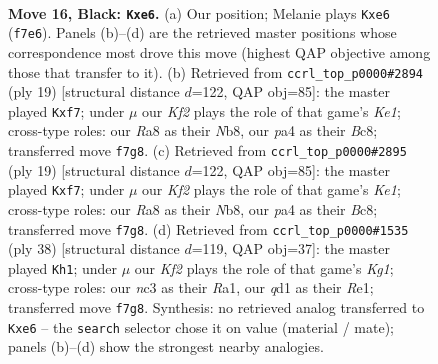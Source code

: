 \documentclass[11pt]{article}
\begin{document}
\clearpage

\begin{figure}[p]\centering
\begin{subfigure}{0.46\textwidth}\centering
\resizebox{\linewidth}{!}{%
\newchessgame
\chessboard[
  setfen={rnbq1r2/pp1n1k2/4P1p1/2b3P1/P7/2N2N2/1P3P2/R1BQKB1R b KQ - 0 16},
  showmover=false,
  pgfstyle=straightmove, color=movearrow, markmove={f7-e6}
]}
\caption{}
\end{subfigure}\hfill
\begin{subfigure}{0.46\textwidth}\centering
\resizebox{\linewidth}{!}{%
\newchessgame
\chessboard[
  setfen={rnbqk2r/pp2pPbp/6p1/4n3/3N4/2N5/PPP3PP/R1BQKB1R b KQkq - 0 10},
  showmover=false,
  pgfstyle=straightmove, color=movearrow, markmove={e8-f7}
]}
\caption{}
\end{subfigure}
\\[4pt]
\begin{subfigure}{0.46\textwidth}\centering
\resizebox{\linewidth}{!}{%
\newchessgame
\chessboard[
  setfen={rnbqk2r/pp2pPbp/6p1/4n3/3N4/2N5/PPP3PP/R1BQKB1R b KQkq - 0 10},
  showmover=false,
  pgfstyle=straightmove, color=movearrow, markmove={e8-f7}
]}
\caption{}
\end{subfigure}\hfill
\begin{subfigure}{0.46\textwidth}\centering
\resizebox{\linewidth}{!}{%
\newchessgame
\chessboard[
  setfen={r1bqr1k1/1p2bp2/p1n2n1p/3p4/8/1NPB1Q2/PP1N1P1B/R3R1K1 w - - 2 20},
  showmover=false,
  pgfstyle=straightmove, color=movearrow, markmove={g1-h1}
]}
\caption{}
\end{subfigure}
\caption{\textbf{Move 16, Black: \texttt{Kxe6}.} (a) Our position; Melanie plays \texttt{Kxe6} (\texttt{f7e6}). Panels (b)--(d) are the retrieved master positions whose correspondence most drove this move (highest QAP objective among those that transfer to it). (b) Retrieved from \texttt{ccrl\_top\_p0000\#2894} (ply 19) [structural distance $d$=122, QAP obj=85]: the master played \texttt{Kxf7}; under $\mu$ our \emph{Kf2} plays the role of that game's \emph{Ke1}; cross-type roles: our \emph{R}a8 as their \emph{N}b8, our \emph{p}a4 as their \emph{B}c8; transferred move \texttt{f7g8}. (c) Retrieved from \texttt{ccrl\_top\_p0000\#2895} (ply 19) [structural distance $d$=122, QAP obj=85]: the master played \texttt{Kxf7}; under $\mu$ our \emph{Kf2} plays the role of that game's \emph{Ke1}; cross-type roles: our \emph{R}a8 as their \emph{N}b8, our \emph{p}a4 as their \emph{B}c8; transferred move \texttt{f7g8}. (d) Retrieved from \texttt{ccrl\_top\_p0000\#1535} (ply 38) [structural distance $d$=119, QAP obj=37]: the master played \texttt{Kh1}; under $\mu$ our \emph{Kf2} plays the role of that game's \emph{Kg1}; cross-type roles: our \emph{n}c3 as their \emph{R}a1, our \emph{q}d1 as their \emph{R}e1; transferred move \texttt{f7g8}. Synthesis: no retrieved analog transferred to \texttt{Kxe6} -- the \texttt{search} selector chose it on value (material / mate); panels (b)--(d) show the strongest nearby analogies.}
\label{fig:thought-m31}
\end{figure}
\end{document}
